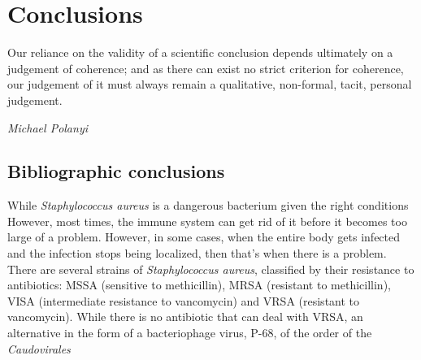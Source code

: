 \chapter{Conclusions}
\epigraph{Our reliance on the validity of a scientific conclusion depends ultimately on a judgement of coherence; and as there can exist no strict criterion for coherence, our judgement of it must always remain a qualitative, non-formal, tacit, personal judgement.}{\textit{Michael Polanyi}}
\section{Bibliographic conclusions}
While \emph{Staphylococcus aureus} is a dangerous bacterium given the right conditions However, most times, the immune system can get rid of it before it becomes too large of a problem. However, in some cases, when the entire body gets infected and the infection stops being localized, then that's when there is a problem. There are several strains of \emph{Staphylococcus aureus}, classified by their resistance to antibiotics: MSSA (sensitive to methicillin), MRSA (resistant to methicillin), VISA (intermediate resistance to vancomycin) and VRSA (resistant to vancomycin). While there is no antibiotic that can deal with VRSA, an alternative in the form of a bacteriophage virus, P-68, of the order of the \emph{Caudovirales}
